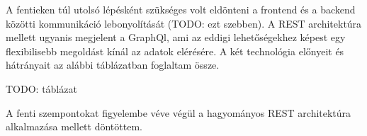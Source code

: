 A fentieken túl utolsó lépésként szükséges volt eldönteni a frontend és a backend közötti kommunikáció lebonyolítását (TODO: ezt szebben).
A REST architektúra mellett ugyanis megjelent a GraphQl, ami az eddigi lehetőségekhez képest egy flexibilisebb megoldást kínál az adatok elérésére.
A két technológia előnyeit és hátrányait az alábbi táblázatban foglaltam össze.

TODO: táblázat

A fenti szempontokat figyelembe véve végül a hagyományos REST architektúra alkalmazása mellett döntöttem.
